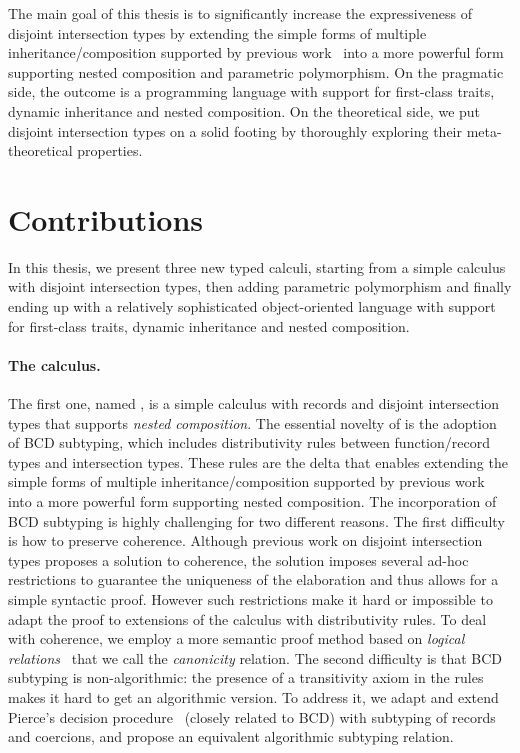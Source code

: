 The main goal of this thesis is to significantly increase the expressiveness of
disjoint intersection types by extending the simple forms of multiple
inheritance/composition supported by previous work~\citep{alpuimdisjoint, oliveira2016disjoint}
into a more powerful form supporting nested composition
and parametric polymorphism. On the pragmatic side, the outcome is a programming
language with support for first-class traits, dynamic inheritance and nested
composition. On the theoretical side, we put disjoint intersection types on a
solid footing by thoroughly exploring their meta-theoretical properties.


\section{Contributions}

In this thesis, we present three new typed calculi, starting from a simple
calculus with disjoint intersection types, then adding parametric polymorphism
and finally ending up with a relatively sophisticated object-oriented language
with support for first-class traits, dynamic inheritance and nested composition.

\paragraph{The \namee calculus.}

The first one, named \namee, is a simple calculus with records and disjoint
intersection types that supports \emph{nested composition}. The essential
novelty of \namee is the adoption of BCD subtyping, which includes distributivity
rules between function/record types and intersection types. These rules are the
delta that enables extending the simple forms of multiple inheritance/composition
supported by previous work~\citep{oliveira2016disjoint} into a more powerful form
supporting nested composition. The incorporation of BCD subtyping is highly
challenging for two different reasons. The first difficulty is how to preserve
coherence. Although previous work on disjoint intersection types proposes a
solution to coherence, the solution imposes several ad-hoc restrictions to
guarantee the uniqueness of the elaboration and thus allows for a simple
syntactic proof. However such restrictions make it hard or
impossible to adapt the proof to extensions of the calculus with distributivity
rules. To deal with coherence, we employ a more semantic proof method based on
\emph{logical relations}~\citep{tait, plotkin1973lambda, statman1985logical}
that we call the \emph{canonicity} relation. The second difficulty is that
BCD subtyping is non-algorithmic: the presence of a transitivity axiom in the
rules makes it hard to get an algorithmic version. To address it, we adapt and extend
Pierce's decision procedure~\citep{pierce1989decision} (closely related to BCD)
with subtyping of records and coercions, and propose an equivalent algorithmic
subtyping relation.

